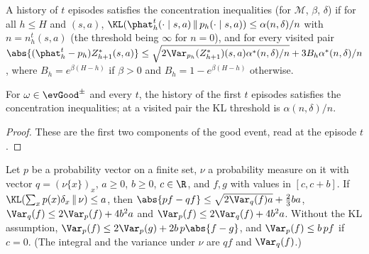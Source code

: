 \begin{definition}\label{def:pos_hist_concentration}
\leanok
{}
A history of $t$ episodes satisfies the concentration inequalities (for $\mathcal M$, $\beta$, $\delta$)
if for all $h \le H$ and $(s, a)$, $\KL(\phat_h^t(\cdot \mid s, a) \,\|\, p_h(\cdot \mid s, a)) \le \alpha(n, \delta)/n$
with $n = n_h^t(s, a)$ (the threshold being $\infty$ for $n = 0$), and for every visited pair
$\abs{(\phat_h^t - p_h)Z^*_{h+1}(s, a)} \le \sqrt{2\Var_{p_h}(Z^*_{h+1})(s, a)\alpha^*(n, \delta)/n} + 3B_h\alpha^*(n, \delta)/n$,
where $B_h = e^{\beta(H - h)}$ if $\beta > 0$ and $B_h = 1 - e^{\beta(H - h)}$ otherwise.
\end{definition}

\begin{lemma}\label{lem:pos_hist_concentration}
\leanok
{}
For $\omega \in \evGood^\pm$ and every $t$, the history of the first $t$ episodes satisfies the
concentration inequalities; at a visited pair the KL threshold is $\alpha(n, \delta)/n$.
\end{lemma}

\begin{proof}
\leanok
These are the first two components of the good event, read at the episode $t$.
\end{proof}

\begin{lemma}\label{lem:pos_vec_kl}
\leanok
{}
Let $p$ be a probability vector on a finite set, $\nu$ a probability measure on it with vector
$q = (\nu\{x\})_x$, $a \ge 0$, $b \ge 0$, $c \in \R$, and $f, g$ with values in $[c, c + b]$. If
$\KL(\sum_x p(x)\delta_x \,\|\, \nu) \le a$, then
$\abs{pf - qf} \le \sqrt{2\Var_q(f)a} + \frac23 ba$, $\Var_q(f) \le 2\Var_p(f) + 4b^2a$ and
$\Var_p(f) \le 2\Var_q(f) + 4b^2a$. Without the KL assumption,
$\Var_p(f) \le 2\Var_p(g) + 2b\,p\abs{f - g}$, and $\Var_p(f) \le b\,pf$ if $c = 0$. (The integral and
the variance under $\nu$ are $qf$ and $\Var_q(f)$.)
\end{lemma}

